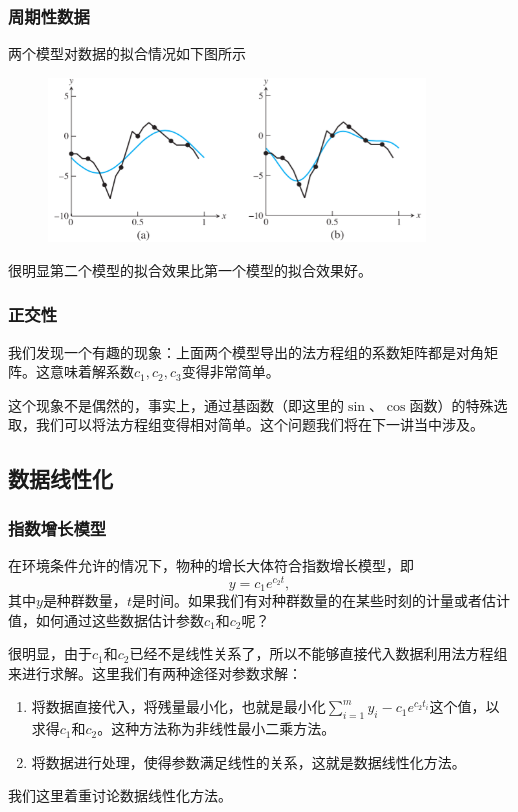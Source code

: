 \documentclass[10pt]{beamer}
\begin{document}
\begin{frame}
\frametitle{周期性数据}
两个模型对数据的拟合情况如下图所示
\begin{figure}
\includegraphics[width=10cm]{figs/4-2-1_Perriodic_Data-5} 
\end{figure}
很明显第二个模型的拟合效果比第一个模型的拟合效果好。
\end{frame}


\begin{frame}
\frametitle{正交性}
我们发现一个有趣的现象：上面两个模型导出的法方程组的系数矩阵都是对角矩阵。这意味着解系数$c_1, c_2, c_3$变得非常简单。

\vspace{0.2cm}

这个现象不是偶然的，事实上，通过基函数（即这里的$\sin$、$\cos$函数）的特殊选取，我们可以将法方程组变得相对简单。这个问题我们将在下一讲当中涉及。
\end{frame}


\subsection{数据线性化}

\begin{frame}
\frametitle{指数增长模型}
在环境条件允许的情况下，物种的增长大体符合指数增长模型，即
\begin{equation}
\label{eq: exponential growth}
y = c_1 e^{c_2 t},
\end{equation}
其中$y$是种群数量，$t$是时间。如果我们有对种群数量的在某些时刻的计量或者估计值，如何通过这些数据估计参数$c_1$和$c_2$呢？

\vspace{0.2cm}

很明显，由于$c_1$和$c_2$已经不是线性关系了，所以不能够直接代入数据利用法方程组来进行求解。这里我们有两种途径对参数求解：
\begin{enumerate}
\item 将数据直接代入，将残量最小化，也就是最小化$\sum_{i = 1}^{m} y_i - c_1 e^{c_2 t_i}$这个值，以求得$c_1$和$c_2$。这种方法称为非线性最小二乘方法。
\item 将数据进行处理，使得参数满足线性的关系，这就是数据线性化方法。
\end{enumerate}

我们这里着重讨论数据线性化方法。
\end{frame}
\end{document}
